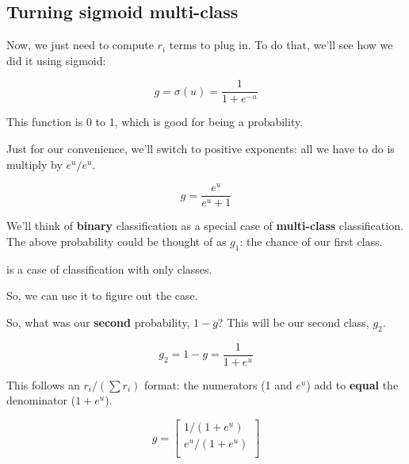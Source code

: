     \subsection*{Turning sigmoid multi-class}
    
        Now, we just need to compute $r_i$ terms to plug in. To do that, we'll see how we did it using sigmoid:
        
        \begin{equation}
            g= \sigma(u) = \frac{1}{1+e^{-u}}
        \end{equation}
        
        This function is 0 to 1, which is good for being a probability. 
        
        Just for our convenience, we'll switch to positive exponents: all we have to do is multiply by $e^u/e^u$.
        
        \begin{equation}
            g = \frac{e^u}{e^u+1}
        \end{equation}
        
        We'll think of \textbf{binary} classification as a special case of \textbf{multi-class} classification. The above probability could be thought of as $g_1$: the chance of our first class.\\
        
        \begin{concept}
             is a  case of  classification with only  classes. 
            
            So, we can use it to figure out the  case.
        \end{concept}
        
        So, what was our \textbf{second} probability, $1-g$? This will be our second class, $g_2$.
        
        \begin{equation}
            g_2 = 1-g= \frac{1}{1+e^{u}}
        \end{equation}
        
        This follows an $r_i/(\sum r_i)$ format: the numerators (1 and $e^u$) add to \textbf{equal} the denominator ($1+e^u$).
        
        \begin{equation}
            g = 
            \begin{bmatrix}
                1/(1+e^u)  \\
                e^u/(1+e^u)  \\
            \end{bmatrix}
        \end{equation}
        
